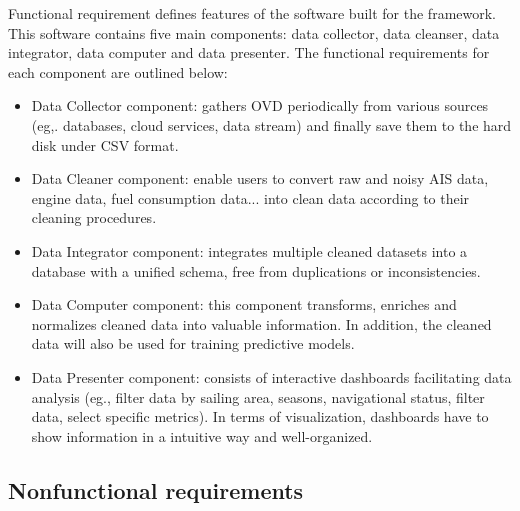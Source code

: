 Functional requirement defines features of the software built for the framework. 
This software contains five main components: data collector, data cleanser, data integrator, data computer and data presenter. The functional requirements for each component are outlined below:
\begin{itemize}
    \item {Data Collector component}:
     gathers OVD periodically from various sources (eg,. databases, cloud services, data stream) and finally save them to the hard disk under CSV format.
     \item {Data Cleaner component}: 
     enable users to convert raw and noisy AIS data, engine data, fuel consumption data... into clean data according to their cleaning procedures.
     \item Data Integrator component:
    integrates multiple cleaned datasets into a database with a unified schema, free from duplications or inconsistencies.
     \item Data Computer component: this component transforms, enriches and normalizes cleaned data into valuable information. In addition, the cleaned data will also be used for training predictive models. 
     \item Data Presenter component: consists of interactive dashboards facilitating data analysis (eg., filter data by sailing area, seasons, navigational status, filter data, select specific metrics). In terms of visualization, dashboards have to show information in a intuitive way and well-organized. 
\end{itemize} 
\subsection{Nonfunctional requirements}

